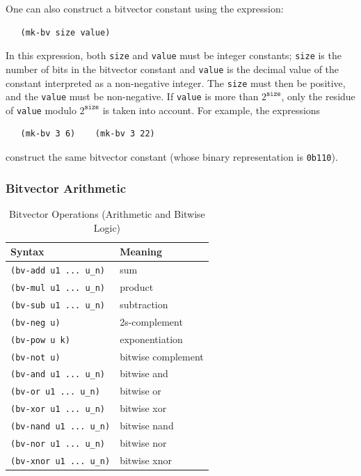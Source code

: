 \documentclass[11pt,twoside,fleqn,openright,titlepage]{cslreport}
\begin{document}
\medskip\noindent
One can also construct a bitvector constant using the expression:
\begin{small}
\begin{verbatim}
   (mk-bv size value)
\end{verbatim}
\end{small}
In this expression, both \texttt{size} and \texttt{value} must be
integer constants; \texttt{size} is the number of bits in the
bitvector constant and \texttt{value} is the decimal value of the
constant interpreted as a non-negative integer. The \texttt{size}
must then be positive, and the \texttt{value} must be
non-negative. If \texttt{value} is more than $2^{\mathtt{size}}$,
only the residue of \texttt{value} modulo $2^{\mathtt{size}}$ is
taken into account. For example, the expressions
\begin{small}
\begin{verbatim}
   (mk-bv 3 6)    (mk-bv 3 22)
\end{verbatim}
\end{small}
construct the same bitvector constant (whose binary representation is
\texttt{0b110}).

\subsubsection*{Bitvector Arithmetic}

\begin{table}
\begin{small}
\begin{center}
\begin{tabular}{|p{5cm}|l|}
\hline Syntax & Meaning \\
\hline
\texttt{(bv-add u1 ... u\_n)} & sum \\
\texttt{(bv-mul u1 ... u\_n)} & product \\
\texttt{(bv-sub u1 ... u\_n)} & subtraction \\
\texttt{(bv-neg u)} & 2s-complement \\
\texttt{(bv-pow u k)} & exponentiation \\
\hline
\texttt{(bv-not u)} & bitwise complement \\
\texttt{(bv-and u1 ... u\_n)} & bitwise and \\
\texttt{(bv-or u1 ... u\_n)} & bitwise or \\
\texttt{(bv-xor u1 ... u\_n)} & bitwise xor \\
\texttt{(bv-nand u1 ... u\_n)} & bitwise nand \\
\texttt{(bv-nor u1 ... u\_n)} & bitwise nor \\
\texttt{(bv-xnor u1 ... u\_n)} & bitwise xnor \\
\hline
\end{tabular}
\end{center}
\end{small}
\caption{Bitvector Operations (Arithmetic and Bitwise Logic)}
\label{bitvectors1}
\end{table}
\end{document}
